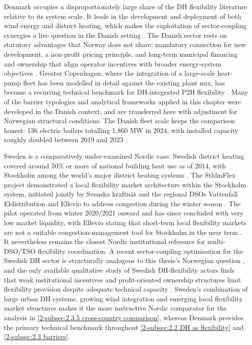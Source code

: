 Denmark occupies a disproportionately large share of the DH flexibility literature relative to its system scale. It leads in the development and deployment of both wind energy and district heating, which makes the exploitation of sector-coupling synergies a live question in the Danish setting \cite{sipos_power_heat_2025}. The Danish sector rests on statutory advantages that Norway does not share: mandatory connection for new development, a non-profit pricing principle, and long-term municipal financing and ownership that align operator incentives with broader energy-system objectives \cite{johansen_something_2022}. Greater Copenhagen, where the integration of a large-scale heat-pump fleet has been modelled in detail against the existing plant mix, has become a recurring technical benchmark for DH-integrated P2H flexibility \cite{bach_integration_2016}. Many of the barrier typologies and analytical frameworks applied in this chapter were developed in the Danish context, and are transferred here with adjustment for Norwegian structural conditions. The Danish fleet scale keeps the comparison honest: 136 electric boilers totalling 1,860 MW in 2024, with installed capacity roughly doubled between 2019 and 2023 \cite{danish_energy_agency_technology_2024}.

Sweden is a comparatively under-examined Nordic case. Swedish district heating covered around $50\%$ or more of national building heat use as of 2014, with Stockholm among the world's major district heating systems \cite{werner_international_2017}. The SthlmFlex project demonstrated a local flexibility market architecture within the Stockholm system, initiated jointly by Svenska kraftnät and the regional DSOs Vattenfall Eldistribution and Ellevio to address congestion during the winter season \cite{nyman_how_2026}. The pilot operated from winter 2020/2021 onward and has since concluded with very low market liquidity, with Ellevio stating that short-term local flexibility markets are not a suitable congestion-management tool for Stockholm in the near term \cite{scrocca_local_2026}. It nevertheless remains the closest Nordic institutional reference for multi-DSO/TSO flexibility coordination. A recent sector-coupling optimisation for the Swedish DH sector is structurally analogous to this thesis's Norwegian question \cite{atabaki_optimising_2026}, and the only available qualitative study of Swedish DH-flexibility actors finds that weak institutional incentives and profit-oriented ownership structures limit flexibility provision despite adequate technical capacity \cite{fernqvist_district_2023}. Sweden's combination of large urban DH systems, growing wind integration and emerging local flexibility market structures makes it the more instructive Nordic comparator for the analysis in \autoref{2-subsec:2.3.5 cross-country comparison}, whereas Denmark provides the primary technical benchmark throughout \autoref{2-subsec:2.2 DH as flexibility} and \autoref{2-subsec:2.3 barriers}.

